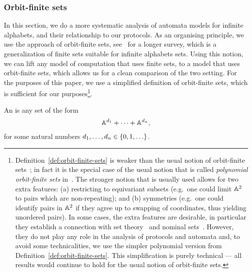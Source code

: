 \subsubsection{Orbit-finite sets}
\label{sec:orbit-finite-sets}
\AP
In this section, we do a more systematic analysis of automata models for
infinite alphabets, and their relationship to our protocols. As an organising
principle, we use the approach of orbit-finite sets,
see~\cite{bojanczykOrbitFiniteSetsTheir2017} for a longer survey, which is a
generalization of finite sets suitable for infinite alphabets sets. Using this
notion, we can lift any model of computation that uses finite sets, to a model
that uses orbit-finite sets, which allows us for a clean comparison of the two
setting. For the purposes of this paper, we use a simplified definition of
orbit-finite sets, which is sufficient for our purposes\footnote{
Definition~\ref{def:orbit-finite-sets} is weaker than the usual notion of orbit-finite sets~\cite[Section 5]{bojanczyk_slightly}; in fact it is the special case of the usual notion that is called \emph{polynomial orbit-finite sets} in~\cite[Section 1]{bojanczyk_slightly}.
The stronger  notion that is usually used  allows for two extra features: (a) restricting to equivariant subsets (e.g.~one could limit $\mathbb A^2$ to pairs which are non-repeating); and (b)  symmetries (e.g.~one could identify pairs in $\mathbb A^2$ if they agree up to swapping of coordinates, thus yielding unordered pairs). In some cases, the extra features are desirable, in particular they establish a connection with set theory~\cite{blassDedekind2016} and  nominal sets~\cite[Section 5]{PittsAM:nomsns}. However, they do not play any role in the analysis of protocols and automata and, to avoid some technicalities, we use the simpler polynomial version from Definition~\ref{def:orbit-finite-sets}. This simplification is purely technical --- all results would continue to hold for the usual notion of orbit-finite sets.
}.
\begin{definition} \label{def:orbit-finite-sets}
  \AP
  An  is any set of the form 
    \begin{align*}
    \mathbb A^{d_1} + \cdots + \mathbb A^{d_n},
    \end{align*}
    for some natural numbers $d_1,\ldots,d_n \in \{0,1,\ldots\}$. 
\end{definition}

